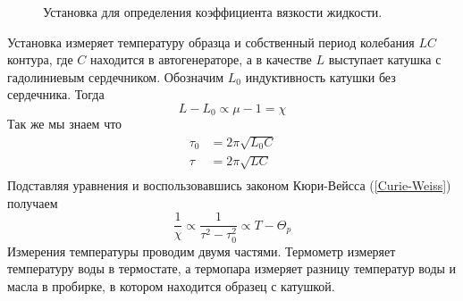 \documentclass[a4paper, 12pt]{article}
\begin{document}
    \begin{figure}[h]
        \caption{Установка для определения коэффициента вязкости жидкости.}
        \label{img:ustanovka}
        \newpage
    \end{figure}


    Установка измеряет температуру образца и собственный период колебания $LC$ контура,
    где $C$ находится в автогенераторе, а в качестве $L$ выступает катушка с гадолиниевым
    сердечником. Обозначим $L_0$ индуктивность катушки без сердечника. Тогда
    \begin{equation*}
        L - L_0 \propto \mu - 1 = \chi
    \end{equation*}
    Так же мы знаем что
    \begin{align*}
        \tau_0 &= 2\pi\sqrt{L_0C} \\
        \tau &= 2\pi\sqrt{LC} \\
    \end{align*}
    Подставляя уравнения и воспользовавшись законом Кюри-Вейсса (\ref{Curie-Weiss}) получаем
    \begin{equation}
        \frac{1}{\chi} \propto \frac{1}{\tau^2 - \tau_0^2} \propto T - \Theta_p
    \end{equation}
    Измерения температуры проводим двумя частями. Термометр измеряет температуру воды в
    термостате, а термопара измеряет разницу температур воды и масла в пробирке, в котором находится образец с катушкой.
\end{document}
